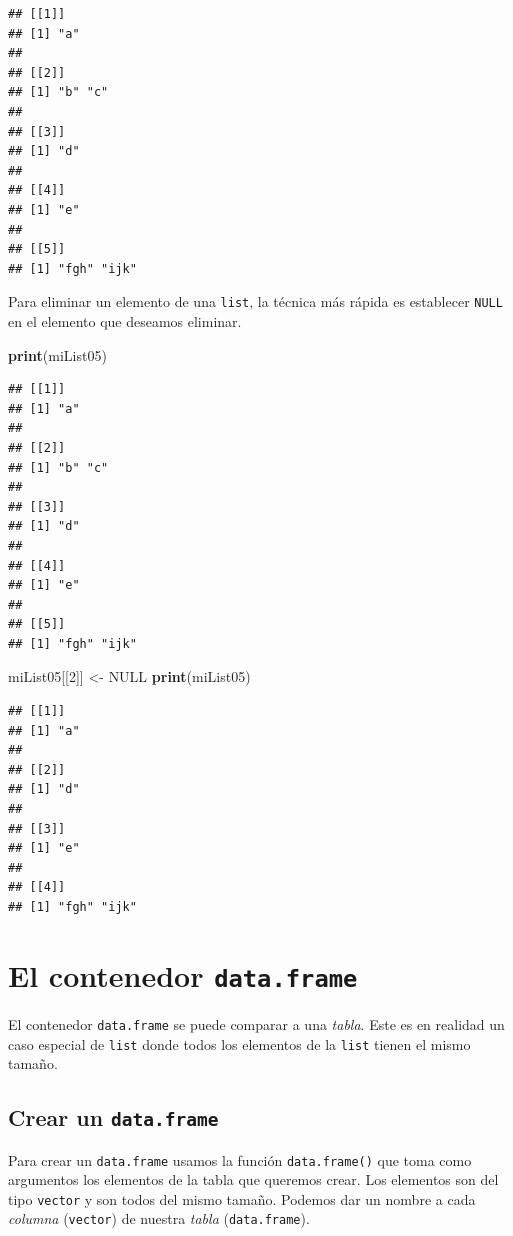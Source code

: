 \documentclass[]{book}
\newenvironment{Shaded}{\begin{snugshade}}{\end{snugshade}}
\newcommand{\KeywordTok}[1]{\textcolor[rgb]{0.13,0.29,0.53}{\textbf{#1}}}
\newcommand{\DecValTok}[1]{\textcolor[rgb]{0.00,0.00,0.81}{#1}}
\newcommand{\StringTok}[1]{\textcolor[rgb]{0.31,0.60,0.02}{#1}}
\newcommand{\OtherTok}[1]{\textcolor[rgb]{0.56,0.35,0.01}{#1}}
\newcommand{\NormalTok}[1]{#1}
\begin{document}
\begin{verbatim}
## [[1]]
## [1] "a"
## 
## [[2]]
## [1] "b" "c"
## 
## [[3]]
## [1] "d"
## 
## [[4]]
## [1] "e"
## 
## [[5]]
## [1] "fgh" "ijk"
\end{verbatim}

Para eliminar un elemento de una \texttt{list}, la técnica más rápida es
establecer \texttt{NULL} en el elemento que deseamos eliminar.

\begin{Shaded}
\begin{Highlighting}[]
\KeywordTok{print}\NormalTok{(miList05)}
\end{Highlighting}
\end{Shaded}

\begin{verbatim}
## [[1]]
## [1] "a"
## 
## [[2]]
## [1] "b" "c"
## 
## [[3]]
## [1] "d"
## 
## [[4]]
## [1] "e"
## 
## [[5]]
## [1] "fgh" "ijk"
\end{verbatim}

\begin{Shaded}
\begin{Highlighting}[]
\NormalTok{miList05[[}\DecValTok{2}\NormalTok{]] <-}\StringTok{ }\OtherTok{NULL}
\KeywordTok{print}\NormalTok{(miList05)}
\end{Highlighting}
\end{Shaded}

\begin{verbatim}
## [[1]]
## [1] "a"
## 
## [[2]]
## [1] "d"
## 
## [[3]]
## [1] "e"
## 
## [[4]]
## [1] "fgh" "ijk"
\end{verbatim}

\hypertarget{l014dataframe}{\section{\texorpdfstring{El contenedor
\texttt{data.frame}}{El contenedor data.frame}}\label{l014dataframe}}

El contenedor \texttt{data.frame} se puede comparar a una \emph{tabla}.
Este es en realidad un caso especial de \texttt{list} donde todos los
elementos de la \texttt{list} tienen el mismo tamaño.

\subsection{\texorpdfstring{Crear un
\texttt{data.frame}}{Crear un data.frame}}\label{crear-un-data.frame}

Para crear un \texttt{data.frame} usamos la función
\texttt{data.frame()} que toma como argumentos los elementos de la tabla
que queremos crear. Los elementos son del tipo \texttt{vector} y son
todos del mismo tamaño. Podemos dar un nombre a cada \emph{columna}
(\texttt{vector}) de nuestra \emph{tabla} (\texttt{data.frame}).
\end{document}
